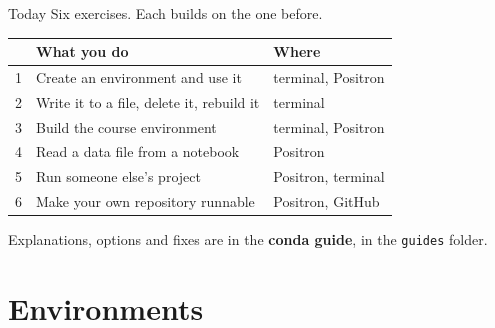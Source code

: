 \documentclass[aspectratio=169,11pt]{beamer}
\newcommand{\code}[1]{\texttt{#1}}
\newcommand{\key}[1]{\textbf{\textcolor{ban}{#1}}}
\begin{document}
\begin{frame}{Today}
  Six exercises. Each builds on the one before.
  \vspace{0.8em}

  \centering
  \begin{tabular}{c l l}
    & \textbf{What you do} & \textbf{Where} \\ \hline
    1 & Create an environment and use it & terminal, Positron \\
    2 & Write it to a file, delete it, rebuild it & terminal \\
    3 & Build the course environment & terminal, Positron \\
    4 & Read a data file from a notebook & Positron \\
    5 & Run someone else's project & Positron, terminal \\
    6 & Make your own repository runnable & Positron, GitHub \\
  \end{tabular}

  \vspace{1em}
  \raggedright
  Explanations, options and fixes are in the \key{conda guide}, in the \code{guides} folder.
\end{frame}

\section{Environments}
\end{document}
